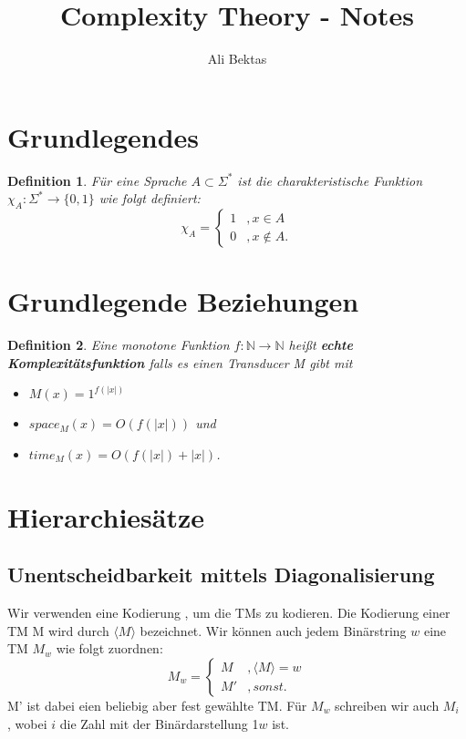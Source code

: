 \documentclass{article}
\author{Ali Bektas}
\title{Complexity Theory - Notes}
\newtheorem{definition}{Definition}[section]
\begin{document}
	\maketitle
	\newpage
	\tableofcontents
	\newpage


	\section{Grundlegendes}
	
	\begin{definition}
		Für eine Sprache $A \subset \Sigma^* $ ist die charakteristische Funktion $\chi_A \colon \Sigma^* \rightarrow \{0, 1\}$ wie folgt definiert:
		\[
			\chi_A = \begin{cases}
					1 &, x \in A \\
					0 &, x \notin A.
				\end{cases}
		\]
	\end{definition}

\section{Grundlegende Beziehungen}
	\begin{definition} \label{complexity_function}
		Eine monotone Funktion $f \colon \mathbb{N} \rightarrow \mathbb{N}$ heißt \textbf{echte Komplexitätsfunktion} falls es einen Transducer M gibt mit\\
		\begin{itemize}
			\item $M(x) = 1^{f(|x|)}$
			\item $space_M(x) = O(f(|x|))$ und
			\item $time_M(x) = O(f(|x|)+|x|)$.
		\end{itemize}
	\end{definition}

	

\section{Hierarchiesätze}
	
	
	\subsection{Unentscheidbarkeit mittels Diagonalisierung}

	Wir verwenden eine Kodierung , um die TMs zu kodieren. Die 
	Kodierung einer TM M wird durch $ \langle M \rangle $ bezeichnet. Wir können auch jedem Binärstring $w$ eine TM $M_w$ wie folgt zuordnen:
		\[ M_w = \begin{cases}
				M &, \langle M \rangle = w \\
				M'&, sonst.
				\end{cases}
		  \]
  	M' ist dabei eien beliebig aber fest gewählte TM. Für $M_w$ schreiben wir auch $M_i$ , wobei $i$ die Zahl mit der Binärdarstellung 1$w$ ist.
\end{document}
